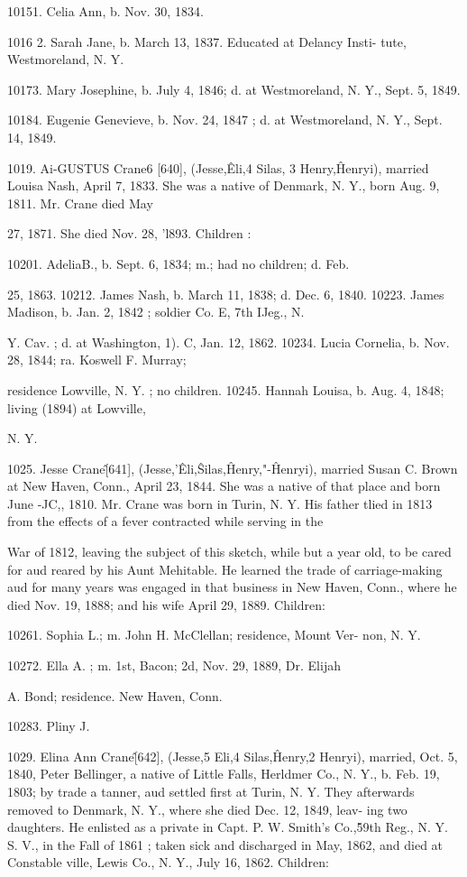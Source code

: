 10151. Celia Ann, b. Nov. 30, 1834. 

1016  2. Sarah Jane, b. March 13, 1837. Educated at Delancy Insti- 
tute, Westmoreland, N. Y. 

10173. Mary Josephine, b. July 4, 1846; d. at Westmoreland, N. 
Y., Sept. 5, 1849. 

10184. Eugenie Genevieve, b. Nov. 24, 1847 ; d. at Westmoreland, 
N. Y., Sept. 14, 1849. 

1019. Ai-GUSTUS Crane6 [640], (Jesse,\^ Eli,4 Silas, 3 Henry,\^ 
Henryi), married Louisa Nash, April 7, 1833. She was a native 
of Denmark, N. Y., born Aug. 9, 1811. Mr. Crane died May 

27, 1871. She died Nov. 28, 'l893. Children : 

10201. AdeliaB., b. Sept. 6, 1834; m.; had no children; d. Feb. 

25, 1863. 
10212. James Nash, b. March 11, 1838; d. Dec. 6, 1840. 
10223. James Madison, b. Jan. 2, 1842 ; soldier Co. E, 7th IJeg., N. 

Y. Cav. ; d. at Washington, 1). C, Jan. 12, 1862. 
10234. Lucia Cornelia, b. Nov. 28, 1844; ra. Koswell F. Murray; 

residence Lowville, N. Y. ; no children. 
10245. Hannah Louisa, b. Aug. 4, 1848; living (1894) at Lowville, 

N. Y. 

1025. Jesse Crane\^ [641], (Jesse,'\^ Eli,\^ Silas,\^ Henry,"-\^ 
Henryi), married Susan C. Brown at New Haven, Conn., April 
23, 1844. She was a native of that place and born June -JC,, 
1810. Mr. Crane was born in Turin, N. Y. His father tlied in 
1813 from the effects of a fever contracted while serving in the 




War of 1812, leaving the subject of this sketch, while but a year 
old, to be cared for aud reared by his Aunt Mehitable. He 
learned the trade of carriage-making aud for many years was 
engaged in that business in New Haven, Conn., where he died 
Nov. 19, 1888; and his wife April 29, 1889. Children: 

10261. Sophia L.; m. John H. McClellan; residence, Mount Ver- 
non, N. Y. 

10272. Ella A. ; m. 1st, Bacon; 2d, Nov. 29, 1889, Dr. Elijah 

A. Bond; residence. New Haven, Conn. 

10283. Pliny J. 

1029. Elina Ann Crane\^ [642], (Jesse,5 Eli,4 Silas,\^ Henry,2 
Henryi), married, Oct. 5, 1840, Peter Bellinger, a native of 
Little Falls, Herldmer Co., N. Y., b. Feb. 19, 1803; by trade a 
tanner, aud settled first at Turin, N. Y. They afterwards 
removed to Denmark, N. Y., where she died Dec. 12, 1849, leav- 
ing two daughters. He enlisted as a private in Capt. P. W. 
Smith's Co.,\^59th Reg., N. Y. S. V., in the Fall of 1861 ; taken 
sick and discharged in May, 1862, and died at Constable ville, 
Lewis Co., N. Y., July 16, 1862. Children: 


